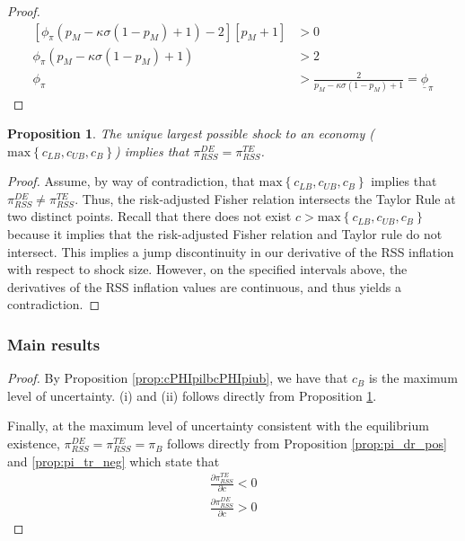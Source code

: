 \documentclass[11pt]{article}
\newtheorem{proposition}{Proposition}
\begin{document}
\begin{singlespace}
\begin{proof}
\begin{align*}
			\left[\phi_{\pi}(p_M - \kappa\sigma(1-p_M) + 1) - 2\right]\left[p_M + 1\right] &> 0 \\
			\phi_{\pi}(p_M - \kappa\sigma(1-p_M) + 1) &> 2 \\
			\phi_{\pi} &> \frac{2}{p_M - \kappa\sigma(1-p_M) + 1}  = \underline{\phi}_{\pi}
			\end{align*} 	
		\end{proof}
		\begin{proposition}\label{prop:oneRSS}
			The unique largest possible shock to an economy ($\text{max}\left\{c_{LB}, c_{UB}, c_{B}\right\}$) implies that $\pi_{RSS}^{DE} = \pi_{RSS}^{TE}$.
		\end{proposition}
		\begin{proof}
			Assume, by way of contradiction, that $\text{max}\left\{c_{LB}, c_{UB}, c_{B}\right\}$ implies that $\pi_{RSS}^{DE} \ne \pi_{RSS}^{TE}$. Thus, the risk-adjusted Fisher relation intersects the Taylor Rule at two distinct points. Recall that there does not exist $c > \text{max}\left\{c_{LB}, c_{UB}, c_{B}\right\}$ because it implies that the risk-adjusted Fisher relation and Taylor rule do not intersect. This implies a jump discontinuity in our derivative of the RSS inflation with respect to shock size. However, on the specified intervals above, the derivatives of the RSS inflation values are continuous, and thus yields a contradiction.
		\end{proof}
		
		\subsubsection{Main results}
		
		\proptwo*
		
		\begin{proof}
			By Proposition \ref{prop:cPHIpilbcPHIpiub}, we have that $c_B$ is the maximum level of uncertainty. (i) and (ii) follows directly from Proposition \ref{prop:oneRSS}.
			
			Finally, at the maximum level of uncertainty consistent with the equilibrium existence, $\pi_{RSS}^{DE} = \pi_{RSS}^{TE} = \pi_{B}$ follows directly from Proposition \ref{prop:pi_dr_pos} and \ref{prop:pi_tr_neg} which state that
			\begin{align*}
			\frac{\partial\pi_{RSS}^{TE}}{\partial c} < 0\\
			\frac{\partial\pi_{RSS}^{DE}}{\partial c} > 0
			\end{align*} 
		\end{proof}
		

\end{singlespace}
\end{document}
